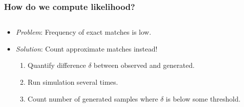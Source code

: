 \documentclass[11pt]{beamer}
\begin{document}
    \begin{frame}
        \frametitle{How do we compute likelihood?}
        \begin{columns}
            \begin{column}{0.6\textwidth}
                \begin{itemize}
                    \item \emph{Problem}: Frequency of exact matches is low. \bigskip
                    \item \emph{Solution}: Count approximate matches instead!
                        \begin{enumerate}
                            \item Quantify difference $\delta$ between observed and generated.
                            \item Run simulation several times.
                            \item Count number of generated samples where $\delta$ is below some threshold.
                        \end{enumerate}
                \end{itemize}
            \end{column}
            \begin{column}{0.4\textwidth}
                \begin{flushleft}
                    
                \end{flushleft}
            \end{column}
        \end{columns}

        \note{
            \footnotesize
            \begin{enumerate}
                \item
            \end{enumerate}
        }
    \end{frame}
\end{document}
